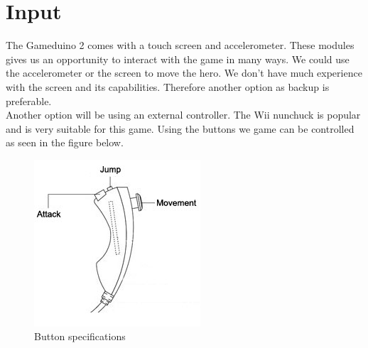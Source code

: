 

\section{Input}
The Gameduino 2 comes with a touch screen and accelerometer. These modules gives us an opportunity to interact with the game in many ways. We could use the accelerometer or the screen to move the hero. We don’t have much experience with the screen and its capabilities. Therefore another option as backup is preferable.\\
Another option will be using an external controller. The Wii nunchuck is popular and is very suitable for this game.  Using the buttons we game can be controlled as seen in the figure below.

\begin{figure}[h]
  \centering
  \includegraphics[scale=0.6]{Figures/nunchuk}
  \caption{Button specifications}
\label{fig:Nunchuk}
\end{figure}